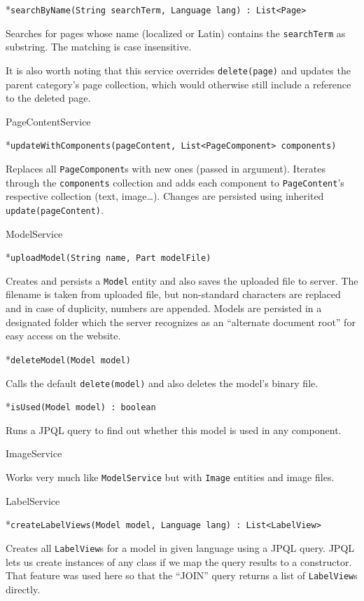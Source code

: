 *{\tt searchByName(String searchTerm, Language lang) : List<Page>}

Searches for pages whose name (localized or Latin) contains the {\tt searchTerm} as substring. The matching is case insensitive.

\enditems

It is also worth noting that this service overrides {\tt delete(page)} and updates the parent category’s page collection, which would otherwise still include a reference to the deleted page.

\secc PageContentService

\begitems

*{\tt updateWithComponents(pageContent, List<PageComponent> components)}

Replaces all {\tt PageComponent}s with new ones (passed in argument). Iterates through the {\tt components} collection and adds each component to {\tt PageContent}’s respective collection (text, image…). Changes are persisted using inherited {\tt update(pageContent)}.

\enditems

\secc ModelService

\begitems

*{\tt uploadModel(String name, Part modelFile)}

Creates and persists a {\tt Model} entity and also saves the uploaded file to server. The filename is taken from uploaded file, but non-standard characters are replaced and in case of duplicity, numbers are appended. Models are persisted in a designated folder which the server recognizes as an “alternate document root” for easy access on the website.

*{\tt deleteModel(Model model)}

Calls the default {\tt delete(model)} and also deletes the model’s binary file.

*{\tt isUsed(Model model) : boolean}

Runs a JPQL query to find out whether this model is used in any component.

\enditems

\secc ImageService

Works very much like {\tt ModelService} but with {\tt Image} entities and image files.

\secc LabelService

\begitems

*{\tt createLabelViews(Model model, Language lang) : List<LabelView>}

Creates all {\tt LabelView}s for a model in given language using a JPQL query. JPQL lets us create instances of any class if we map the query results to a constructor. That feature was used here so that the “JOIN” query returns a list of {\tt LabelView}s directly.

